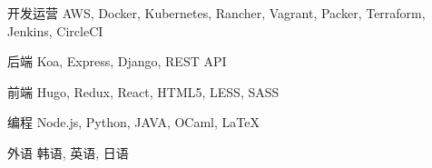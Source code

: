 

\begin{cvskills}

  \cvskill
    {开发运营} %
    {AWS, Docker, Kubernetes, Rancher, Vagrant, Packer, Terraform, Jenkins, CircleCI} %

  \cvskill
    {后端} %
    {Koa, Express, Django, REST API} %

  \cvskill
    {前端} %
    {Hugo, Redux, React, HTML5, LESS, SASS} %

  \cvskill
    {编程} %
    {Node.js, Python, JAVA, OCaml, LaTeX} %

  \cvskill
    {外语} %
    {韩语, 英语, 日语} %

\end{cvskills}
